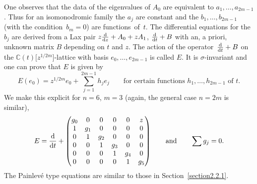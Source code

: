 \documentclass[pdftex]{sigma}
\numberwithin{equation}{section}
\begin{document}
 One observes that the data of the eigenvalues of $A_0$ are equivalent to $a_1,\dots , a_{2m-1}$. Thus for an
 isomonodromic family the $a_j$ are constant and the $b_1,\dots, b_{2m-1}$ (with the condition~${b_m=0}$)
 are functions~of~$t$. The differential equations for the $b_j$ are derived from a
 Lax pair $z\frac{{\rm d}}{{\rm d}z}+A_0+zA_1$, $ \frac{{\rm d}}{{\rm d}t}+B$ with an, a priori, unknown matrix $B$ depending on $t$ and $z$.
 The action of the operator~${\frac{{\rm d}}{{\rm d}t}+B}$ on the $\mathbb{C}(t)\bigl[z^{1/2m}\bigr]$-lattice with basis $e_0,\dots ,e_{2m-1}$ is called $E$. It is $\sigma$-invariant and one can prove that $E$ is given by
 \[ E(e_0)=z^{1/2m}e_0+\sum _{j=1}^{2m-1}h_je_j \qquad \mbox{for certain functions } h_1,\dots ,h_{2m-1} \mbox{ of } t.\]
 We make this explicit for $n=6$, $m=3$ (again, the general case $n=2m$ is similar),
 \[ E=\frac{{\rm d}}{{\rm d}t}+
\begin{pmatrix} g_0 &0 &0 &0 &0 &z \\
 1&g_1 &0 &0 &0 &0 \\
 0&1 &g_2 &0 &0 &0 \\
 0& 0& 1&g_3 &0 &0 \\
 0&0 &0&1 &g_4 &0 \\
 0&0 &0 & 0&1 &g _5\end{pmatrix}\qquad\mbox{and} \qquad\sum g_j=0. \]
The Painlev\'e type equations are similar to those in Section~\ref{section2.2.1}.
\end{document}
